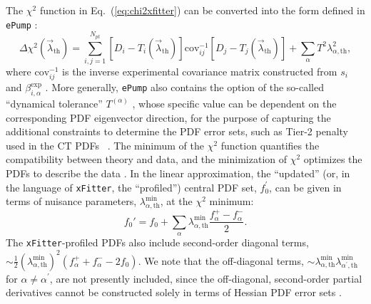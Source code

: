 The $\chi^{2}$ function in Eq.~(\ref{eq:chi2xfitter}) can be converted into the form defined in \texttt{ePump} \cite{Schmidt:2018hvu,Hou:2019gfw}:
%
\begin{equation}\label{eq:chi2ePump}
\Delta\chi^{2}(\vec{\lambda}_{\textrm{th}})
=\sum_{i,j=1}^{N_\mathit{pt}}
[D_i-T_{i}(\vec{\lambda}_{\textrm{th}})]
\textrm{cov}_{ij}^{-1}[D_j-T_{j}(\vec{\lambda}_{\textrm{th}})]
+\sum_{\alpha}T^2\lambda_{\alpha,\textrm{th}}^{2},
\end{equation}
%
where $\textrm{cov}_{ij}^{-1}$ is the inverse experimental covariance matrix constructed from $s_i$ and
$\beta_{i,\alpha}^{\textrm{exp}}$ \cite{Gao:2013xoa}. 
More generally, \texttt{ePump} also contains the option of the so-called ``dynamical tolerance'' $T^{(\alpha)}$ \cite{Schmidt:2018hvu,Hou:2019gfw}, whose specific value can be dependent on the corresponding PDF eigenvector direction, for the purpose of capturing the additional constraints to determine the PDF error sets, such as Tier-2 penalty used in the CT PDFs ~\cite{Dulat:2015mca}. The minimum of the $\chi^{2}$
function quantifies the compatibility between theory and data, and the minimization of $\chi^{2}$ optimizes the PDFs to describe the data \cite{Paukkunen:2014zia,Schmidt:2018hvu}.
In the linear approximation, the ``updated'' (or, in the language of \texttt{xFitter}, the ``profiled'') central PDF set, $f_{0}^{'}$, can be given in terms of nuisance parameters,
$\lambda_{\alpha,\textrm{th}}^{\textrm{min}}$, at the $\chi^{2}$ minimum:
%
\begin{equation}\label{eq:updatePDF}
f_{0}'=f_{0}+\sum_{\alpha} \lambda^{\textrm{min}}_{\alpha,\textrm{th}}\frac{f_{\alpha}^{+}-f_{\alpha}^{-}}{2}.
\end{equation}
%
The \texttt{xFitter}-profiled PDFs also include second-order diagonal terms, \linebreak
$\sim\! \frac{1}{2}(\lambda^{\textrm{min}}_{\alpha,\textrm{th}})^{2}(f_\alpha^{+}+f_\alpha^{-}-2f_0)$.
We note that the off-diagonal terms, $\sim\! \lambda^{\textrm{min}}_{\alpha,\textrm{th}}\lambda^{\textrm{min}}_{\alpha^\prime,\textrm{th}}$ for $\alpha\neq \alpha^\prime$, are not presently included,
since the off-diagonal, second-order partial derivatives cannot be constructed solely in terms of Hessian PDF error sets \cite{Hou:2016sho}. 
 
